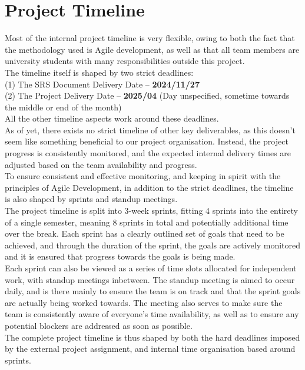 \section{Project Timeline}

Most of the internal project timeline is very flexible, owing to both the fact that the methodology used is Agile development, 
as well as that all team members are university students with many responsibilities outside this project. \\

The timeline itself is shaped by two strict deadlines: \\
(1) The SRS Document Delivery Date -- \textbf{2024/11/27} \\
(2) The Project Delivery Date -- \textbf{2025/04} (Day unspecified, sometime towards the middle or end of the month) \\

All the other timeline aspects work around these deadlines. \\

As of yet, there exists no strict timeline of other key deliverables, as this doesn't seem like something beneficial to our project organisation.
Instead, the project progress is consistently monitored, and the expected internal delivery times are adjusted based on the team availability and progress. \\

To ensure consistent and effective monitoring, and keeping in spirit with the principles of Agile Development, in addition to the strict deadlines, the timeline is also shaped by sprints and standup meetings. \\

The project timeline is split into 3-week sprints, fitting 4 sprints into the entirety of a single semester, meaning 8 sprints in total and potentially additional time over the break.
Each sprint has a clearly outlined set of goals that need to be achieved, and through the duration of the sprint, the goals are actively monitored and it is ensured that progress towards the goals is being made. \\

Each sprint can also be viewed as a series of time slots allocated for independent work, with standup meetings inbetween.
The standup meeting is aimed to occur daily, and is there mainly to ensure the team is on track and that the sprint goals are actually being worked towards.
The meeting also serves to make sure the team is consistently aware of everyone's time availability, as well as to ensure any potential blockers are addressed as soon as possible. \\

The complete project timeline is thus shaped by both the hard deadlines imposed by the external project assignment, and internal time organisation based around sprints.

